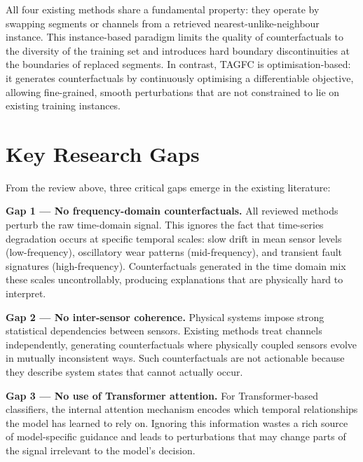 All four existing methods share a fundamental property: they operate by swapping segments or channels from a retrieved nearest-unlike-neighbour instance. This instance-based paradigm limits the quality of counterfactuals to the diversity of the training set and introduces hard boundary discontinuities at the boundaries of replaced segments. In contrast, TAGFC is optimisation-based: it generates counterfactuals by continuously optimising a differentiable objective, allowing fine-grained, smooth perturbations that are not constrained to lie on existing training instances.

\section{Key Research Gaps}

From the review above, three critical gaps emerge in the existing literature:

\textbf{Gap 1 — No frequency-domain counterfactuals.} All reviewed methods perturb the raw time-domain signal. This ignores the fact that time-series degradation occurs at specific temporal scales: slow drift in mean sensor levels (low-frequency), oscillatory wear patterns (mid-frequency), and transient fault signatures (high-frequency). Counterfactuals generated in the time domain mix these scales uncontrollably, producing explanations that are physically hard to interpret.

\textbf{Gap 2 — No inter-sensor coherence.} Physical systems impose strong statistical dependencies between sensors. Existing methods treat channels independently, generating counterfactuals where physically coupled sensors evolve in mutually inconsistent ways. Such counterfactuals are not actionable because they describe system states that cannot actually occur.

\textbf{Gap 3 — No use of Transformer attention.} For Transformer-based classifiers, the internal attention mechanism encodes which temporal relationships the model has learned to rely on. Ignoring this information wastes a rich source of model-specific guidance and leads to perturbations that may change parts of the signal irrelevant to the model's decision.


